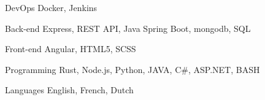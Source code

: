 

\begin{cvskills}

  \cvskill
    {DevOps} %
    {Docker, Jenkins} %

  \cvskill
    {Back-end} %
    {Express, REST API, Java Spring Boot, mongodb, SQL} %

  \cvskill
    {Front-end} %
    {Angular, HTML5, SCSS} %

  \cvskill
    {Programming} %
    {Rust, Node.js, Python, JAVA, C\#, ASP.NET, BASH} %

  \cvskill
    {Languages} %
    {English, French, Dutch} %

\end{cvskills}
